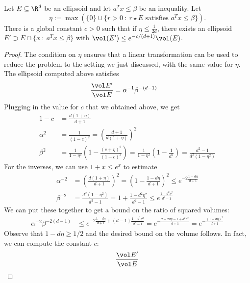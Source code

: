 \begin{lemma}
  \label{lemma:generalized-half-ball}
  Let $E \subseteq \R^d$ be an ellipsoid and let
  $a^Tx \leq \beta$ be an inequality.
  Let
  \[
    \eta := \max(\{ 0 \} \cup \{ r > 0 ~:~ r \star E \text{ satisfies } a^Tx \leq \beta \}).
  \]
  There is a global constant $c > 0$
  such that if $\eta \leq \frac{1}{2d}$,
  there exists an ellipsoid $E' \supset E \cap \{ x ~:~ a^Tx \leq \beta \}$
  with $\vol(E') \leq e^{-c/(d+1)}\vol(E)$.
\end{lemma}
\begin{proof}
  The condition on $\eta$ ensures that a linear transformation can be used to reduce the problem to the setting we just discussed,
  with the same value for $\eta$.
  The ellipsoid computed above satisfies
  \begin{align*}
    \frac{\vol E'}{\vol E}
      &= \alpha^{-1} \beta^{-(d-1)}
  \end{align*}
  Plugging in the value for $c$ that we obtained above, we get
  \begin{align*}
    1 - c &= \frac{d(1 + \eta)}{d + 1} \\
    \alpha^2 &= \frac{1}{(1-c)^2} = \left( \frac{d+1}{d(1+\eta)} \right)^2 \\
    \beta^2 &= \frac{1}{1 - \eta^2} \left( 1 - \frac{(c+\eta)^2}{(1-c)^2} \right) = \frac{1}{1-\eta^2} \left(1 - \frac{1}{d^2} \right) = \frac{d^2 - 1}{d^2(1 - \eta^2)}
  \end{align*}
  For the inverses, we can use $1 + x \leq e^x$ to estimate
  \begin{align*}
    \alpha^{-2} &= \left(\frac{d(1+\eta)}{d+1}\right)^2 = \left(1 - \frac{1 - d\eta}{d+1}\right)^2 \leq e^{-2 \frac{1 - d\eta}{d+1}} \\
    \beta^{-2} &= \frac{d^2(1 - \eta^2)}{d^2 - 1} = 1 + \frac{1 - d^2\eta^2}{d^2-1} \leq e^{\frac{1 - d^2\eta^2}{d^2 - 1}}
  \end{align*}
  We can put these together to get a bound on the ratio of squared volumes:
  \begin{align*}
    \alpha^{-2} \beta^{-2(d-1)}
      &\leq e^{-2 \frac{1-d\eta}{d+1} + (d-1) \frac{1 - d^2\eta^2}{d^2 - 1}}
      = e^{-\frac{2 - 2d\eta - 1 + d^2\eta^2}{d+1}}
      = e^{-\frac{(1 - d\eta)^2}{d+1}}
  \end{align*}
  Observe that $1 - d\eta \geq 1/2$ and the desired bound on the volume follows.
  In fact, we can compute the constant $c$:
  \begin{align*}
    \frac{\vol E'}{\vol E}

\end{align*}
\end{proof}
